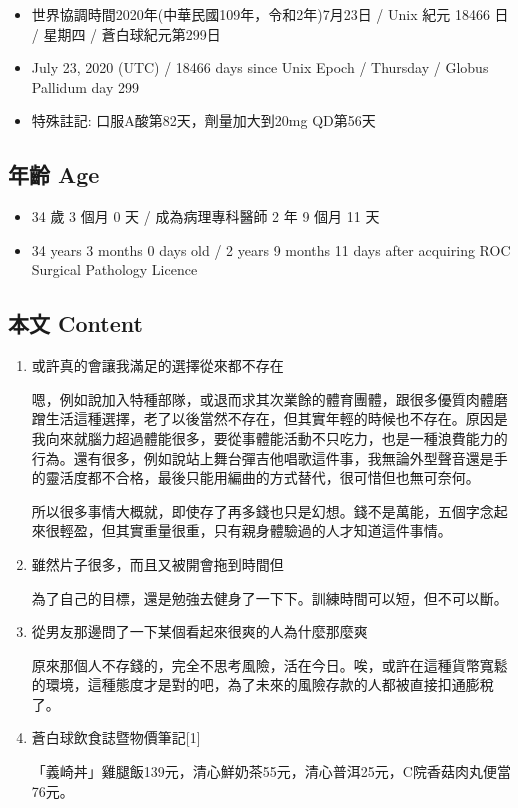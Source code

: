 \documentclass[a5paper, 11pt
]{book}
\providecommand{\tightlist}{%
  \setlength{\itemsep}{0pt}\setlength{\parskip}{0pt}}
\begin{document}
\begin{itemize}
\tightlist
\item
  世界協調時間2020年(中華民國109年，令和2年)7月23日 / Unix 紀元 18466 日
  / 星期四 / 蒼白球紀元第299日
\item
  July 23, 2020 (UTC) / 18466 days since Unix Epoch / Thursday / Globus
  Pallidum day 299
\item
  特殊註記: 口服A酸第82天，劑量加大到20mg QD第56天
\end{itemize}

\hypertarget{ux5e74ux9f61-age-52}{%
\subsection{年齡 Age}\label{ux5e74ux9f61-age-52}}

\begin{itemize}
\tightlist
\item
  34 歲 3 個月 0 天 / 成為病理專科醫師 2 年 9 個月 11 天
\item
  34 years 3 months 0 days old / 2 years 9 months 11 days after
  acquiring ROC Surgical Pathology Licence
\end{itemize}

\hypertarget{ux672cux6587-content-52}{%
\subsection{本文 Content}\label{ux672cux6587-content-52}}

\begin{enumerate}
\def\labelenumi{\arabic{enumi}.}
\item
  或許真的會讓我滿足的選擇從來都不存在

  嗯，例如說加入特種部隊，或退而求其次業餘的體育團體，跟很多優質肉體磨蹭生活這種選擇，老了以後當然不存在，但其實年輕的時候也不存在。原因是我向來就腦力超過體能很多，要從事體能活動不只吃力，也是一種浪費能力的行為。還有很多，例如說站上舞台彈吉他唱歌這件事，我無論外型聲音還是手的靈活度都不合格，最後只能用編曲的方式替代，很可惜但也無可奈何。

  所以很多事情大概就，即使存了再多錢也只是幻想。錢不是萬能，五個字念起來很輕盈，但其實重量很重，只有親身體驗過的人才知道這件事情。
\item
  雖然片子很多，而且又被開會拖到時間但

  為了自己的目標，還是勉強去健身了一下下。訓練時間可以短，但不可以斷。
\item
  從男友那邊問了一下某個看起來很爽的人為什麼那麼爽

  原來那個人不存錢的，完全不思考風險，活在今日。唉，或許在這種貨幣寬鬆的環境，這種態度才是對的吧，為了未來的風險存款的人都被直接扣通膨稅了。
\item
  蒼白球飲食誌暨物價筆記{[}1{]}

  「義崎丼」雞腿飯139元，清心鮮奶茶55元，清心普洱25元，C院香菇肉丸便當76元。
\end{enumerate}
\end{document}
